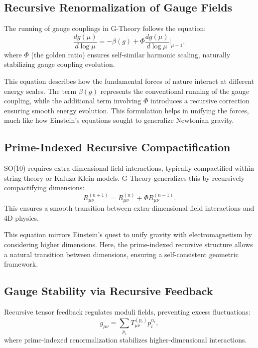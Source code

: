 \documentclass[12]{amsart}
\theoremstyle{plain}
\begin{document}
\subsection{Recursive Renormalization of Gauge Fields}
The running of gauge couplings in G-Theory follows the equation:
\begin{equation}
    \frac{d g(\mu)}{d \log \mu} = -\beta(g) + \Phi \frac{d g(\mu)}{d \log \mu} \bigg|_{\mu - 1},
\end{equation}
where $\Phi$ (the golden ratio) ensures self-similar harmonic scaling, naturally stabilizing gauge coupling evolution.

This equation describes how the fundamental forces of nature interact at different energy scales. The term $\beta(g)$ represents the conventional running of the gauge coupling, while the additional term involving $\Phi$ introduces a recursive correction ensuring smooth energy evolution. This formulation helps in unifying the forces, much like how Einstein's equations sought to generalize Newtonian gravity.

\subsection{Prime-Indexed Recursive Compactification}
SO(10) requires extra-dimensional field interactions, typically compactified within string theory or Kaluza-Klein models. G-Theory generalizes this by recursively compactifying dimensions:
\begin{equation}
    R_{\mu\nu}^{(n+1)} = R_{\mu\nu}^{(n)} + \Phi R_{\mu\nu}^{(n-1)}.
\end{equation}
This ensures a smooth transition between extra-dimensional field interactions and 4D physics.

This equation mirrors Einstein’s quest to unify gravity with electromagnetism by considering higher dimensions. Here, the prime-indexed recursive structure allows a natural transition between dimensions, ensuring a self-consistent geometric framework.

\subsection{Gauge Stability via Recursive Feedback}
Recursive tensor feedback regulates moduli fields, preventing excess fluctuations:
\begin{equation}
    g_{\mu\nu} = \sum_{p_i} T_{\mu\nu}^{(p_i)} p_i^{\alpha_i},
\end{equation}
where prime-indexed renormalization stabilizes higher-dimensional interactions.
\end{document}
